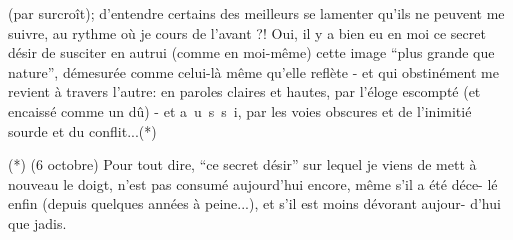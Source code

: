 (par surcroît); d'entendre certains des meilleurs se lamenter qu'ils ne peuvent
me suivre, au rythme où je cours de l'avant ?! Oui, il y a bien eu en moi ce
secret désir de susciter en autrui (comme en moi-même) cette image ``plus grande
que nature'', démesurée comme celui-là même qu'elle reflète - et qui obstinément
me revient à travers l'autre: en paroles claires et hautes, par l'éloge escompté
(et encaissé comme un dû) - et \mbox{a u s s i}, par les voies obscures et 
de l'inimitié sourde et du conflit...(*)

(*) (6 octobre) Pour tout dire, ``ce secret désir'' sur lequel je viens de mett
à nouveau le doigt, n'est pas consumé aujourd'hui encore, même s'il a été déce-\linebreak
lé enfin (depuis quelques années à peine...), et s'il est moins dévorant aujour-\linebreak
d'hui que jadis.
